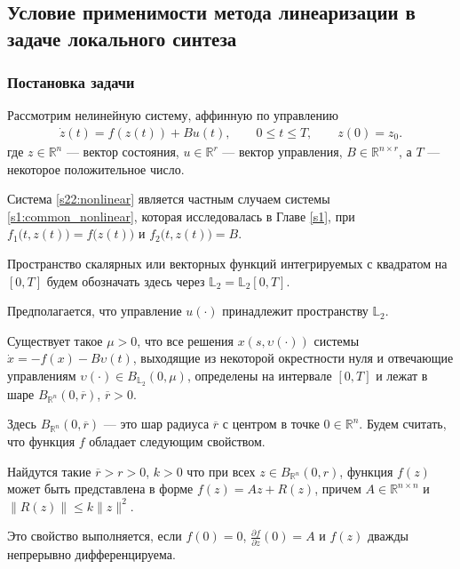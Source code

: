 \documentclass[../main.tex]{subfiles}
\begin{document}
\subsection{Условие применимости метода линеаризации в задаче локального синтеза} 

\subsubsection{Постановка задачи}

Рассмотрим нелинейную систему, аффинную по управлению
\begin{gather}\label{s22:nonlinear}
    \dot{z}(t)=f(z(t))+B u(t),\qquad 0 \leqslant t \leqslant T, \qquad z(0) = z_0.
\end{gather}
 где $ z \in \mathbb{R}^n $ --- вектор состояния, $ u \in \mathbb{R}^r $ --- вектор управления, $B \in \mathbb{R}^{n \times r}$, а $ 
T$ --- некоторое положительное число. 

Система \eqref{s22:nonlinear} является частным случаем системы \eqref{s1:common_nonlinear}, которая исследовалась в Главе \ref{s1}, при $f_1\big(t,z(t)\big) = f\big(z(t)\big)$ и $f_2\big(t,z(t)\big) = B$. 

Пространство скалярных или векторных функций интегрируемых с квадратом  на $ [0,T] $ будем обозначать здесь через $ \mathbb{L}_2 = \mathbb{L}_2[0,T] $.  

Предполагается, что управление $u(\cdot)$  принадлежит пространству $\mathbb{L}_2 $.
\begin{assumption}\label{s22:as:solution_bounded}
	Существует такое $\mu > 0$, что все решения $x(s, \upsilon(\cdot))$ системы $\dot{x} = -f(x)-B\upsilon(t)$, выходящие из некоторой окрестности нуля и отвечающие управлениям $\upsilon(\cdot) \in B_{\mathbb{L}_2}(0, \mu)$, определены на интервале $[0, T]$ и лежат в шаре $ B_{\mathbb{R}^n}(0,\overline{r})$, $\overline{r} > 0$.
\end{assumption}
Здесь $ B_{\mathbb{R}^n}(0,\overline{r}) $ --- это шар радиуса $\overline{r}$  с центром в точке $0 \in \mathbb{R}^n$. 
Будем считать, что функция $f$ обладает следующим свойством.

\begin{assumption}\label{s22:as:Residial_term_bounds}
     Найдутся такие  $\overline{r} > r >0$, $k>0$  что при всех $ z \in B_{\mathbb{R}^n}(0,r) $, функция  $f(z)$ может быть представлена в форме  $ f(z) = Az + R(z) $, причем $A \in \mathbb{R}^{n \times n}$ и $ \|R(z) \| \leqslant k \| z\|^2  $. 
\end{assumption}
Это свойство выполняется, если $f(0) = 0 $, $\frac{\partial f}{\partial z}(0) 
= A $ и $f(z)$ дважды непрерывно дифференцируема. 
\end{document}
